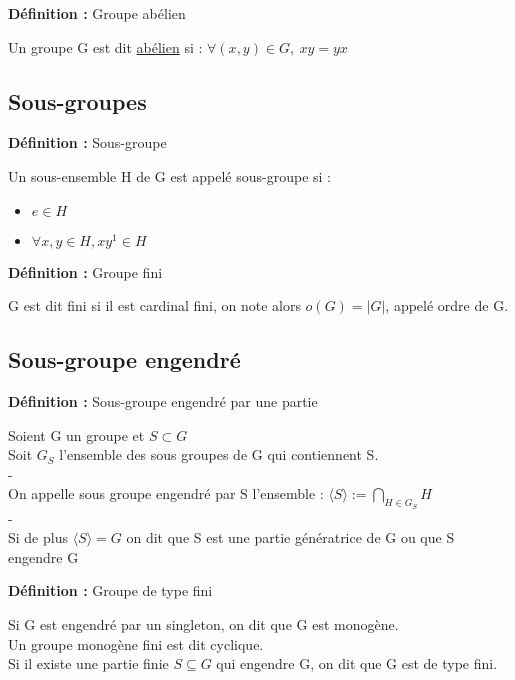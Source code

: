 \documentclass{report}
\newenvironment{definition}[1][]{
    \begin{tcolorbox}[colframe= white]
    \textbf{Définition :} 
    #1 \par
    }
    {\end{tcolorbox}}
\newcommand{\dsp}{\displaystyle}
\begin{document}
\begin{definition}[Groupe abélien]
Un groupe G est dit \underline{abélien} si : $\forall (x,y)\in G,~xy=yx$
\end{definition}

\subsection{Sous-groupes}

\begin{definition}[Sous-groupe]
Un sous-ensemble H de G est appelé sous-groupe si :
\begin{itemize}[label=$\bullet$]
\item $e\in H$
\item $\forall x,y \in H, xy^{1}\in H$
\end{itemize}
\end{definition}

\begin{definition}[Groupe fini]
G est dit fini si il est cardinal fini, on note alors $o(G) = |G|$, appelé ordre de G.
\end{definition}


\subsection{Sous-groupe engendré}

\begin{definition}[Sous-groupe engendré par une partie]
Soient G un groupe et $S\subset G$\\
Soit $G_{S}$ l'ensemble des sous groupes de G qui contiennent S. \\
{\color{white}-}\\
On appelle sous groupe engendré par S l'ensemble : $ \dsp\langle S\rangle := \bigcap _{H\in G_{S}}H$\\
{\color{white}-}\\
Si de plus $\langle S\rangle = G$ on dit que S est une partie génératrice de G ou que S engendre G
\end{definition}

\begin{definition}[Groupe de type fini]
Si G est engendré par un singleton, on dit que G est monogène. \\
Un groupe monogène fini est dit cyclique. \\Si il existe une partie finie $S\subseteq G$ qui engendre G, on dit que G est de type fini.
\end{definition}
\end{document}
